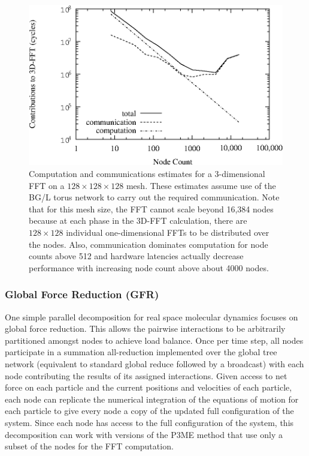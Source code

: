 \documentclass[doublespacing]{elsart}
\begin{document}
\begin{figure}
\begin{center}
\includegraphics[keepaspectratio, width=\textwidth]{estimate_fft}
\caption{Computation and communications estimates for a 3-dimensional
FFT on a $128\times 128\times 128$ mesh.  These estimates assume use
of the BG/L torus network to carry out the required communication.
Note that for this mesh size, the FFT cannot scale beyond 16,384 nodes
because at each phase in the 3D-FFT calculation, there are $128\times
128$ individual one-dimensional FFTs to be distributed over the nodes.
Also, communication dominates computation for node counts above 512
and hardware latencies actually decrease performance with increasing
node count above about 4000 nodes.}
\label{fig:estimate_fft}
\end{center}
\end{figure}

\subsubsection{Global Force Reduction (GFR)\label{sect:gfr}}

One simple parallel decomposition for real space molecular dynamics
focuses on global force reduction. This allows the pairwise
interactions to be arbitrarily partitioned amongst nodes to achieve
load balance.  Once per time step, all nodes participate in a
summation all-reduction implemented over the global tree network
(equivalent to standard global reduce followed by a broadcast) with
each node contributing the results of its assigned interactions.
Given access to net force on each particle and the current positions
and velocities of each particle, each node can replicate the numerical
integration of the equations of motion for each particle to give every
node a copy of the updated full configuration of the system.  Since
each node has access to the full configuration of the system, this
decomposition can work with versions of the P3ME method that use only
a subset of the nodes for the FFT computation.
\end{document}
